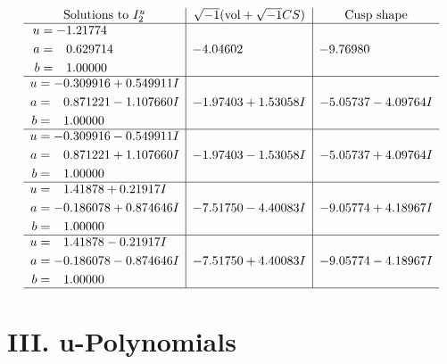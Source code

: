 \documentclass[1p]{elsarticle_modified}
\theoremstyle{definition}
\newcommand{\I}{\sqrt{-1}}
\begin{document}
$$\begin{array}{c|c|c}  
\text{Solutions to }I^u_{2}& \I (\text{vol} + \sqrt{-1}CS) & \text{Cusp shape}\\
 \hline 
\begin{aligned}
u &= -1.21774\phantom{ +0.000000I} \\
a &= \phantom{-}0.629714\phantom{ +0.000000I} \\
b &= \phantom{-}1.00000\phantom{ +0.000000I}\end{aligned}
 & -4.04602\phantom{ +0.000000I} & -9.76980\phantom{ +0.000000I} \\ \hline\begin{aligned}
u &= -0.309916 + 0.549911 I \\
a &= \phantom{-}0.871221 - 1.107660 I \\
b &= \phantom{-}1.00000\phantom{ +0.000000I}\end{aligned}
 & -1.97403 + 1.53058 I & -5.05737 - 4.09764 I \\ \hline\begin{aligned}
u &= -0.309916 - 0.549911 I \\
a &= \phantom{-}0.871221 + 1.107660 I \\
b &= \phantom{-}1.00000\phantom{ +0.000000I}\end{aligned}
 & -1.97403 - 1.53058 I & -5.05737 + 4.09764 I \\ \hline\begin{aligned}
u &= \phantom{-}1.41878 + 0.21917 I \\
a &= -0.186078 + 0.874646 I \\
b &= \phantom{-}1.00000\phantom{ +0.000000I}\end{aligned}
 & -7.51750 - 4.40083 I & -9.05774 + 4.18967 I \\ \hline\begin{aligned}
u &= \phantom{-}1.41878 - 0.21917 I \\
a &= -0.186078 - 0.874646 I \\
b &= \phantom{-}1.00000\phantom{ +0.000000I}\end{aligned}
 & -7.51750 + 4.40083 I & -9.05774 - 4.18967 I\\
 \hline 
 \end{array}$$\newpage
\newpage\renewcommand{\arraystretch}{1}
\centering \section*{ III. u-Polynomials}
\end{document}
